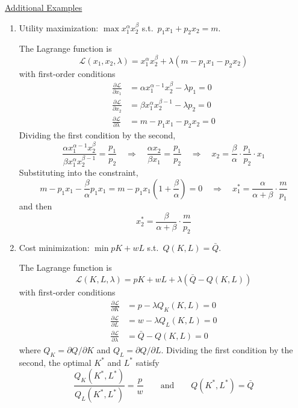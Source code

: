 \underline{Additional Examples}
\begin{enumerate}
\item[1.] Utility maximization: $\max x_1^{\alpha} x_2^{\beta}$ s.t.\ $p_1 x_1 + p_2 x_2 = m$.

The Lagrange function is
\[\mathcal{L}(x_1, x_2, \lambda) = x_1^{\alpha} x_2^{\beta} + \lambda(m - p_1 x_1 - p_2 x_2)\]
with first-order conditions
\begin{align*}
\frac{\partial \mathcal{L}}{\partial x_1} &= \alpha x_1^{\alpha - 1} x_2^{\beta} - \lambda p_1 = 0 \\
\frac{\partial \mathcal{L}}{\partial x_2} &= \beta x_1^{\alpha} x_2^{\beta - 1} - \lambda p_2 = 0 \\
\frac{\partial \mathcal{L}}{\partial \lambda} &= m - p_1 x_1 - p_2 x_2 = 0
\end{align*}
Dividing the first condition by the second,
\[\frac{\alpha x_1^{\alpha - 1} x_2^{\beta}}{\beta x_1^{\alpha} x_2^{\beta - 1}} = \frac{p_1}{p_2} \quad \Rightarrow \quad \frac{\alpha x_2}{\beta x_1} = \frac{p_1}{p_2} \quad \Rightarrow \quad x_2 = \frac{\beta}{\alpha} \cdot \frac{p_1}{p_2} \cdot x_1\]
Substituting into the constraint,
\[m - p_1 x_1 - \frac{\beta}{\alpha} p_1 x_1 = m - p_1 x_1 \left(1 + \frac{\beta}{\alpha}\right) = 0 \quad \Rightarrow \quad x_1^* = \frac{\alpha}{\alpha + \beta} \cdot \frac{m}{p_1}\]
and then
\[x_2^* = \frac{\beta}{\alpha + \beta} \cdot \frac{m}{p_2}\]

\item[2.] Cost minimization: $\min pK + wL$ s.t.\ $Q(K, L) = \bar{Q}$.

The Lagrange function is
\[\mathcal{L}(K, L, \lambda) = pK + wL + \lambda\left(\bar{Q} - Q(K, L)\right)\]
with first-order conditions
\begin{align*}
\frac{\partial \mathcal{L}}{\partial K} &= p - \lambda Q_K(K, L) = 0 \\
\frac{\partial \mathcal{L}}{\partial L} &= w - \lambda Q_L(K, L) = 0 \\
\frac{\partial \mathcal{L}}{\partial \lambda} &= \bar{Q} - Q(K, L) = 0
\end{align*}
where $Q_K = \partial Q / \partial K$ and $Q_L = \partial Q / \partial L$. Dividing the first condition by the second, the optimal $K^*$ and $L^*$ satisfy
\[\frac{Q_K(K^*, L^*)}{Q_L(K^*, L^*)} = \frac{p}{w} \qquad \text{and} \qquad Q(K^*, L^*) = \bar{Q}\]


\end{enumerate}
